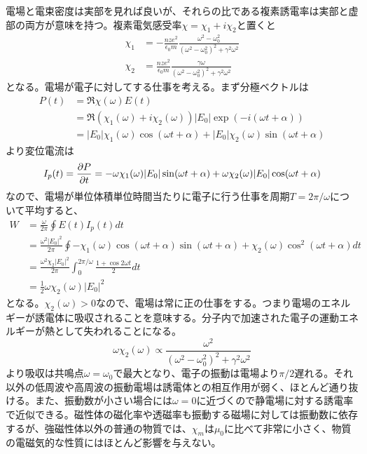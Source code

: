     電場と電束密度は実部を見れば良いが、それらの比である複素誘電率は実部と虚部の両方が意味を持つ。複素電気感受率$\chi = \chi_1 + i\chi_2$と置くと
    \begin{align*}
        \chi_1 &= -\frac{nze^2}{\epsilon_0m}\frac{\omega^2 - \omega_0^2}{(\omega^2 - \omega_0^2)^2 + \gamma^2\omega^2}\\
        \chi_2 &= \frac{nze^2}{\epsilon_0m}\frac{\gamma\omega}{(\omega^2 - \omega_0^2)^2 + \gamma^2\omega^2}
    \end{align*}
    となる。電場が電子に対してする仕事を考える。まず分極ベクトルは
    \begin{align*}
        P(t)
            &= \Re\chi(\omega)E(t)\\
            &= \Re(\chi_1(\omega) + i\chi_2(\omega))|E_0|\exp(-i(\omega t + \alpha))\\
            &= |E_0|\chi_1(\omega)\cos(\omega t + \alpha) + |E_0|\chi_2(\omega)\sin(\omega t + \alpha)
    \end{align*}
    より変位電流は
    \begin{align*}
        I_p(t) = \pd[P]{t} = -\omega\chi_1(\omega)|E_0|\sin(\omega t + \alpha) + \omega\chi_2(\omega)|E_0|\cos(\omega t + \alpha)
    \end{align*}
    なので、電場が単位体積単位時間当たりに電子に行う仕事を周期$T = 2\pi / \omega$について平均すると、
    \begin{align*}
        W   &= \frac{\omega}{2\pi}\oint E(t)I_p(t)dt\\
            &= \frac{\omega^2|E_0|^2}{2\pi}\oint -\chi_1(\omega)\cos(\omega t + \alpha)\sin(\omega t + \alpha) + \chi_2(\omega)\cos^2(\omega t + \alpha) dt\\
            &= \frac{\omega^2\chi_2|E_0|^2}{2\pi}\int_0^{2\pi / \omega} \frac{1 + \cos 2\omega t}{2} dt\\
            &= \frac{1}{2}\omega\chi_2(\omega)|E_0|^2
    \end{align*}
    となる。$\chi_2(\omega) > 0$なので、電場は常に正の仕事をする。つまり電場のエネルギーが誘電体に吸収されることを意味する。分子内で加速された電子の運動エネルギーが熱として失われることになる。
        \[\omega\chi_2(\omega) \propto \frac{\omega^2}{(\omega^2 - \omega_0^2)^2 + \gamma^2\omega^2}\]
    より吸収は共鳴点$\omega = \omega_0$で最大となり、電子の振動は電場より$\pi / 2$遅れる。それ以外の低周波や高周波の振動電場は誘電体との相互作用が弱く、ほとんど通り抜ける。また、振動数が小さい場合には$\omega = 0$に近づくので静電場に対する誘電率で近似できる。磁性体の磁化率や透磁率も振動する磁場に対しては振動数に依存するが、強磁性体以外の普通の物質では、$\chi_m$は$\mu_0$に比べて非常に小さく、物質の電磁気的な性質にはほとんど影響を与えない。

